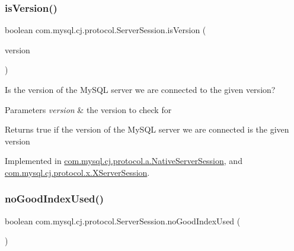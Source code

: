 \subsubsection{\texorpdfstring{is\+Version()}{isVersion()}}
{\footnotesize\ttfamily boolean com.\+mysql.\+cj.\+protocol.\+Server\+Session.\+is\+Version (\begin{DoxyParamCaption}\item[{\mbox{\hyperlink{classcom_1_1mysql_1_1cj_1_1_server_version}{Server\+Version}}}]{version }\end{DoxyParamCaption})}

Is the version of the My\+S\+QL server we are connected to the given version?


\begin{DoxyParams}{Parameters}
{\em version} & the version to check for\\
\hline
\end{DoxyParams}
\begin{DoxyReturn}{Returns}
true if the version of the My\+S\+QL server we are connected is the given version 
\end{DoxyReturn}


Implemented in \mbox{\hyperlink{classcom_1_1mysql_1_1cj_1_1protocol_1_1a_1_1_native_server_session_a07301eeaa6402981ce961f528b4e09ef}{com.\+mysql.\+cj.\+protocol.\+a.\+Native\+Server\+Session}}, and \mbox{\hyperlink{classcom_1_1mysql_1_1cj_1_1protocol_1_1x_1_1_x_server_session_aa121370ff7a1579fd5d7f4d653594f49}{com.\+mysql.\+cj.\+protocol.\+x.\+X\+Server\+Session}}.

\mbox{\label{interfacecom_1_1mysql_1_1cj_1_1protocol_1_1_server_session_affcc78ef2327efa3f81f7937ca3ca439}} 
\subsubsection{\texorpdfstring{no\+Good\+Index\+Used()}{noGoodIndexUsed()}}
{\footnotesize\ttfamily boolean com.\+mysql.\+cj.\+protocol.\+Server\+Session.\+no\+Good\+Index\+Used (\begin{DoxyParamCaption}{ }\end{DoxyParamCaption})}



